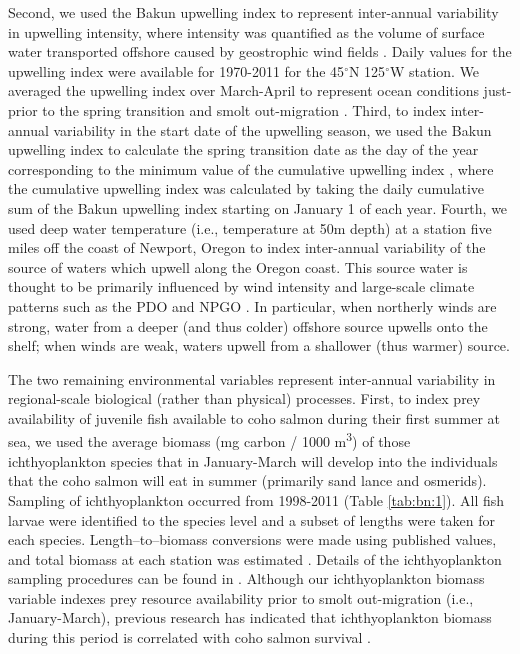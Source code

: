 Second, we used the Bakun upwelling index to represent inter-annual variability
in upwelling intensity, where intensity was quantified as the volume of surface
water transported offshore caused by geostrophic wind fields \citep{Bakun1973,
Schwing1996}. Daily values for the upwelling index were available for 1970-2011
for the 45$^{\circ}$N 125$^{\circ}$W station.  We averaged the upwelling index
over March-April to represent ocean conditions just-prior to the spring
transition and smolt out-migration \citep{Logerwell2003a, Lawson1997}. Third, to
index inter-annual variability in the start date of the upwelling season, we
used the Bakun upwelling index to calculate the spring transition date as the
day of the year corresponding to the minimum value of the cumulative upwelling
index \citep{Bakun1973, Bograd2009}, where the cumulative upwelling index was
calculated by taking the daily cumulative sum of the Bakun upwelling index
starting on January 1 of each year. Fourth, we used deep water temperature
(i.e., temperature at 50m depth) at a station five miles off the coast of
Newport, Oregon to index inter-annual variability of the source of waters which
upwell along the Oregon coast. This source water is thought to be primarily
influenced by wind intensity and large-scale climate patterns such as the PDO
and NPGO \citep{Jacox2014, Chhak2007}. In particular, when northerly winds are
strong, water from a deeper (and thus colder) offshore source upwells onto the
shelf; when winds are weak, waters upwell from a shallower (thus warmer) source.

The two remaining environmental variables represent inter-annual variability in
regional-scale biological (rather than physical) processes. First, to index prey
availability of juvenile fish available to coho salmon during their first summer
at sea, we used the average biomass (mg carbon / 1000 m\textsuperscript{3}) of
those ichthyoplankton species that in January-March will develop into the
individuals that the coho salmon will eat in summer (primarily sand lance and
osmerids).  Sampling of ichthyoplankton occurred from 1998-2011 (Table
\ref{tab:bn:1}). All fish larvae were identified to the species level and a
subset of lengths were taken for each species. Length--to--biomass conversions
were made using published values, and total biomass at each station was
estimated \citep{Peterson2012a}. Details of the ichthyoplankton sampling
procedures can be found in \citet{Daly2013}. Although our ichthyoplankton
biomass variable indexes prey resource availability prior to smolt out-migration
(i.e., January-March), previous research has indicated that ichthyoplankton
biomass during this period is correlated with coho salmon survival
\citep{Daly2013}.

